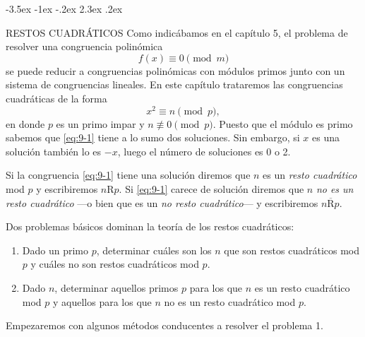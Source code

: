 \documentclass[12pt,a4paper]{book}
\makeatletter
\renewcommand\section{\@startsection{section}{1}{\z@}%
  {-3.5ex \@plus -1ex \@minus -.2ex}%
  {2.3ex \@plus .2ex}%
  {\normalfont\Large\bfseries\raggedright}}
\makeatother
\begin{document}
    \section{RESTOS CUADRÁTICOS}
    Como indicábamos en el capítulo 5, el problema de resolver una congruencia polinómica
    \begin{equation*}
        f(x)\equiv0\pmod{m}
    \end{equation*}
    se puede reducir a congruencias polinómicas con módulos primos junto con un sistema de
    congruencias lineales. En este capítulo trataremos las congruencias cuadráticas de la
    forma
    \begin{equation}\label{eq:9-1}
        x^{2}\equiv n\pmod{p},
    \end{equation}
    en donde $p$ es un primo impar y $n\not\equiv0\pmod{p}$. Puesto que el módulo es primo
    sabemos que \eqref{eq:9-1} tiene a lo sumo dos soluciones. Sin embargo, si $x$ es una
    solución también lo es $-x$, luego el número de soluciones es 0 o 2.

    \begin{definicion}
        Si la congruencia \eqref{eq:9-1} tiene una solución diremos que $n$ es un
        \textit{resto cuadrático} mod $p$ y escribiremos $n\mathrm{R}p$. Si \eqref{eq:9-1}\label{sim:nRp}
        carece de solución diremos que $n$ \textit{no es un resto cuadrático} ---o bien que
        es un \textit{no resto cuadrático}--- y escribiremos $n\overline{\mathrm{R}}p$.
    \end{definicion}

    Dos problemas básicos dominan la teoría de los restos cuadráticos:
    \begin{enumerate}
        \item Dado un primo $p$, determinar cuáles son los $n$ que son restos cuadráticos
        mod $p$ y cuáles no son restos cuadráticos mod $p$.
        \item Dado $n$, determinar aquellos primos $p$ para los que $n$ es un resto
        cuadrático mod $p$ y aquellos para los que $n$ no es un resto cuadrático mod $p$.
    \end{enumerate}
    Empezaremos con algunos métodos conducentes a resolver el problema 1.
\end{document}
